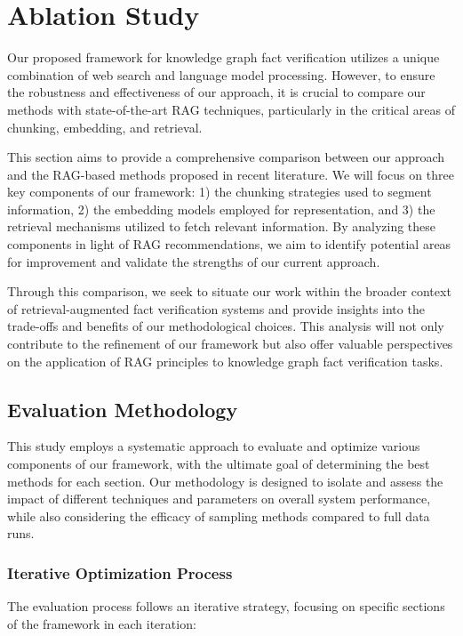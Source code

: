 \chapter{Ablation Study}
\label{ch:ablation}

Our proposed framework for knowledge graph fact verification utilizes a unique combination of web search and language model processing.
However, to ensure the robustness and effectiveness of our approach, it is crucial to compare our methods with state-of-the-art RAG techniques, particularly in the critical areas of chunking, embedding, and retrieval.

This section aims to provide a comprehensive comparison between our approach and the RAG-based methods proposed in recent literature.
We will focus on three key components of our framework: 1) the chunking strategies used to segment information, 2) the embedding models employed for representation, and 3) the retrieval mechanisms utilized to fetch relevant information.
By analyzing these components in light of RAG recommendations, we aim to identify potential areas for improvement and validate the strengths of our current approach.

Through this comparison, we seek to situate our work within the broader context of retrieval-augmented fact verification systems and provide insights into the trade-offs and benefits of our methodological choices.
This analysis will not only contribute to the refinement of our framework but also offer valuable perspectives on the application of RAG principles to knowledge graph fact verification tasks.


\section{Evaluation Methodology}\label{sec:evaluation-methodology}
This study employs a systematic approach to evaluate and optimize various components of our framework, with the ultimate goal of determining the best methods for each section.
Our methodology is designed to isolate and assess the impact of different techniques and parameters on overall system performance, while also considering the efficacy of sampling methods compared to full data runs.

\subsection{Iterative Optimization Process}\label{subsec:iterative-optimization-process}
The evaluation process follows an iterative strategy, focusing on specific sections of the framework in each iteration:

